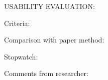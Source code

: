 
USABILITY EVALUATION:




Criteria:




Comparison with paper method:


Stopwatch:

    



Comments from researcher:
    
        
            
